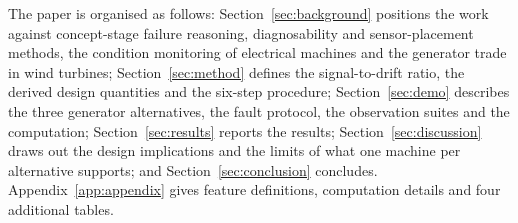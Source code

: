 The paper is organised as follows: Section~\ref{sec:background} positions the work against concept-stage failure reasoning, diagnosability and sensor-placement methods, the condition monitoring of electrical machines and the generator trade in wind turbines; Section~\ref{sec:method} defines the signal-to-drift ratio, the derived design quantities and the six-step procedure; Section~\ref{sec:demo} describes the three generator alternatives, the fault protocol, the observation suites and the computation; Section~\ref{sec:results} reports the results; Section~\ref{sec:discussion} draws out the design implications and the limits of what one machine per alternative supports; and Section~\ref{sec:conclusion} concludes. Appendix~\ref{app:appendix} gives feature definitions, computation details and four additional tables.
